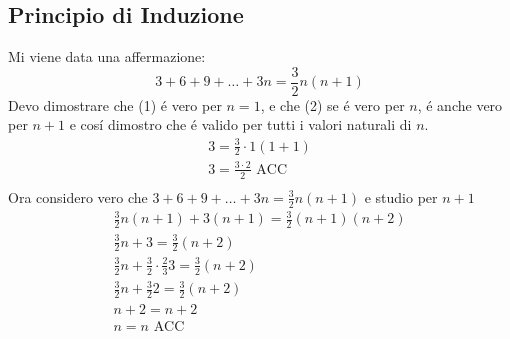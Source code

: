 \documentclass{article}
\begin{document}
\subsection{Principio di Induzione}
Mi viene data una affermazione:
\[
    3+6+9+\dots +3n=\frac{3}{2}n(n+1)
    \]
    Devo dimostrare che (1) é vero per $n=1$, e che (2) se é vero per $n$, é anche vero per $n+1$ e cosí dimostro che é valido per tutti i valori naturali di $n$.
    \begin{gather*}
    3=\frac{3}{2}\cdot 1(1+1)\\
    3=\frac{3\cdot 2}{2}\text{ ACC}\\
\end{gather*}
Ora considero vero che $3+6+9+\dots +3n=\frac{3}{2}n(n+1)$ e studio per $n+1$
\begin{gather*}
    \frac{3}{2}n(n+1)+3(n+1)=\frac{3}{2}(n+1)(n+2)\\
    \frac{3}{2}n+3=\frac{3}{2}(n+2)\\
    \frac{3}{2}n+\frac{3}{2}\cdot\frac{2}{3}3=\frac{3}{2}(n+2)\\
    \frac{3}{2}n+\frac{3}{2}2=\frac{3}{2}(n+2)\\
    n+2=n+2\\
    n=n\text{ ACC}
\end{gather*}
\end{document}
